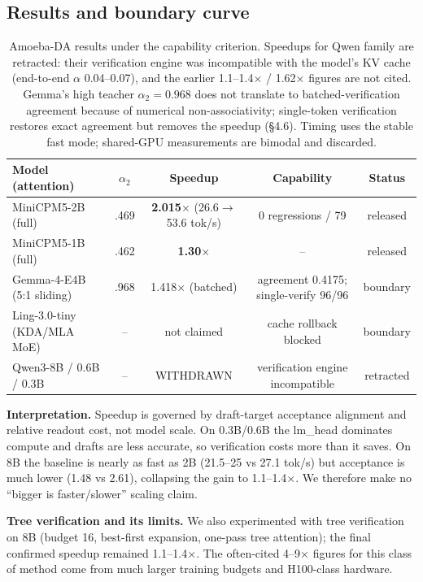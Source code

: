 \documentclass[11pt,a4paper]{article}
\begin{document}
\subsection{Results and boundary curve}
\begin{table}[h]
\centering
\small
\begin{tabular}{lcccc}
\toprule
Model (attention) & $\alpha_2$ & Speedup & Capability & Status\\
\midrule
MiniCPM5-2B (full) & .469 & \textbf{2.015$\times$} (26.6$\to$53.6 tok/s) & 0 regressions / 79 & released\\
MiniCPM5-1B (full) & .462 & \textbf{1.30$\times$} & -- & released\\
Gemma-4-E4B (5:1 sliding) & .968 & 1.418$\times$ (batched) & agreement 0.4175; single-verify 96/96 & boundary\\
Ling-3.0-tiny (KDA/MLA MoE) & -- & not claimed & cache rollback blocked & boundary\\
Qwen3-8B / 0.6B / 0.3B & -- & WITHDRAWN & verification engine incompatible & retracted\\
\bottomrule
\end{tabular}
\caption{Amoeba-DA results under the capability criterion. Speedups for Qwen family are retracted:
their verification engine was incompatible with the model's KV cache (end-to-end $\alpha$ 0.04--0.07),
and the earlier 1.1--1.4$\times$ / 1.62$\times$ figures are not cited. Gemma's high teacher
$\alpha_2=0.968$ does not translate to batched-verification agreement because of numerical
non-associativity; single-token verification restores exact agreement but removes the speedup
(\S4.6). Timing uses the stable fast mode; shared-GPU measurements are bimodal and discarded.}
\end{table}
\noindent\textbf{Interpretation.} Speedup is governed by draft-target acceptance alignment and
relative readout cost, not model scale. On 0.3B/0.6B the lm\_head dominates compute and drafts
are less accurate, so verification costs more than it saves. On 8B the baseline is nearly as
fast as 2B (21.5--25 vs 27.1 tok/s) but acceptance is much lower (1.48 vs 2.61), collapsing the
gain to 1.1--1.4$\times$. We therefore make no ``bigger is faster/slower'' scaling claim.

\noindent\textbf{Tree verification and its limits.} We also experimented with tree verification
on 8B (budget 16, best-first expansion, one-pass tree attention); the final confirmed speedup
remained 1.1--1.4$\times$. The often-cited 4--9$\times$ figures for this class of method come
from much larger training budgets and H100-class hardware.
\end{document}

